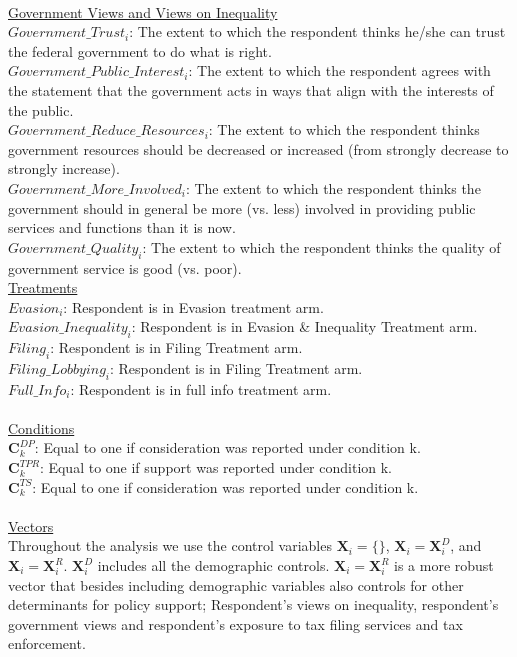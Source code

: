 \documentclass[11pt]{article}
\begin{document}
\\[0.15em]
\underline{Government Views and Views on Inequality} \\[0.15em]
$Government\_Trust_i$: The extent to which the respondent thinks he/she can trust the federal government to do what is right. \\[0.15em]
$Government\_Public\_Interest_i$: The extent to which the respondent agrees with the statement that the government acts in ways that align with the interests of the public.\\[0.15em]
$Government\_Reduce\_Resources_i$: The extent to which the respondent thinks government resources should be decreased or increased (from strongly decrease to strongly increase).\\[0.15em]
$Government\_More\_Involved_i$: The extent to which the respondent thinks the government should in general be more (vs. less) involved in providing public services and functions than it is now. \\[0.15em]
$Government\_Quality_i$: The extent to which the respondent thinks the quality of government service is good (vs. poor). 
\\
\underline{Treatments}\\[0.15em]
$Evasion_i$: Respondent is in Evasion treatment arm. \\[0.15em]
$Evasion\_Inequality_i$: Respondent is in Evasion \& Inequality Treatment arm. \\[0.15em]
$Filing_i$: Respondent is in Filing Treatment arm. \\[0.15em]
$Filing\_Lobbying_i$: Respondent is in Filing Treatment arm. \\[0.15em]
$Full\_Info_i$: Respondent is in full info treatment arm. \\[0.15em]
\\
\underline{Conditions} \\
$\mathbf{C}_k^{DP}$: Equal to one if consideration was reported under condition k.\\[0.15em] 
$\mathbf{C}_k^{TPR}$: Equal to one if support was reported under condition k.  \\[0.15em] 
$\mathbf{C}_k^{TS}$: Equal to one if consideration was reported under condition k. \\[0.15em] 
\\
\underline{Vectors} \\[0.15em]
Throughout the analysis we use the control variables $\mathbf{X}_{i} = \{\}$, $\mathbf{X}_{i} = \mathbf{X}_{i}^{D}$, and $\mathbf{X}_{i} = \mathbf{X}_{i}^{R}$. $\mathbf{X}_{i}^{D}$ includes all the demographic controls. $\mathbf{X}_{i} = \mathbf{X}_{i}^{R}$ is a more robust vector that besides including demographic variables also controls for other determinants for policy support; Respondent's views on inequality, respondent's government views and respondent's exposure to tax filing services and tax enforcement. 
\end{document}
